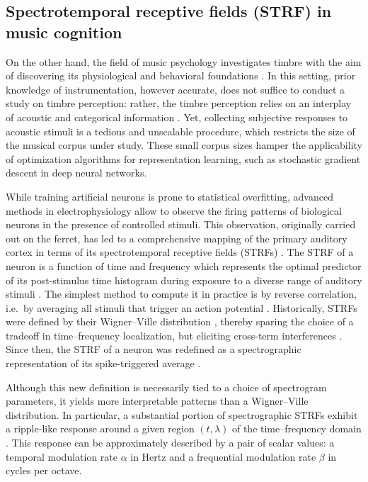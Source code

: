 \documentclass{bmcart}
\begin{document}
\subsection*{Spectrotemporal receptive fields (STRF) in music cognition}
On the other hand, the field of music psychology investigates timbre with the aim of discovering its physiological and behavioral foundations \cite{mcadams2009chapter}.
In this setting, prior knowledge of instrumentation, however accurate, does not suffice to conduct a study on timbre perception: rather, the timbre perception relies on an interplay of acoustic and categorical information \cite{siedenburg2016frontiers}.
Yet, collecting subjective responses to acoustic stimuli is a tedious and unscalable procedure, which restricts the size of the musical corpus under study.
These small corpus sizes hamper the applicability of optimization algorithms for representation learning, such as stochastic gradient descent in deep neural networks.

While training artificial neurons is prone to statistical overfitting, advanced methods in electrophysiology allow to observe the firing patterns of biological neurons in the presence of controlled stimuli.
This observation, originally carried out on the ferret, has led to a comprehensive mapping of the primary auditory cortex in terms of its spectrotemporal receptive fields (STRFs) \cite{depireux2001jneur}.
The STRF of a neuron is a function of time and frequency which represents the optimal predictor of its post-stimulus time histogram during exposure to a diverse range of auditory stimuli \cite{aertsen1981biolcyb}.
The simplest method to compute it in practice is by reverse correlation, i.e.\ by averaging all stimuli that trigger an action potential \cite{deboer1968biomed}.
Historically, STRFs were defined by their Wigner--Ville distribution \cite{flandrin1998book}, thereby sparing the choice of a tradeoff in time--frequency localization, but eliciting cross-term interferences \cite{eggermont1993hearing}.
Since then, the STRF of a neuron was redefined as a spectrographic representation of its spike-triggered average \cite{klein2000compneur}.

Although this new definition is necessarily tied to a choice of spectrogram parameters, it yields more interpretable patterns than a Wigner--Ville distribution.
In particular, a substantial portion of spectrographic STRFs exhibit a ripple-like response around a given region $(t, \lambda)$ of the time--frequency domain \cite{theunissen2000jneur}.
This response can be approximately described by a pair of scalar values: a temporal modulation rate $\alpha$ in Hertz and a frequential modulation rate $\beta$ in cycles per octave.
\end{document}
